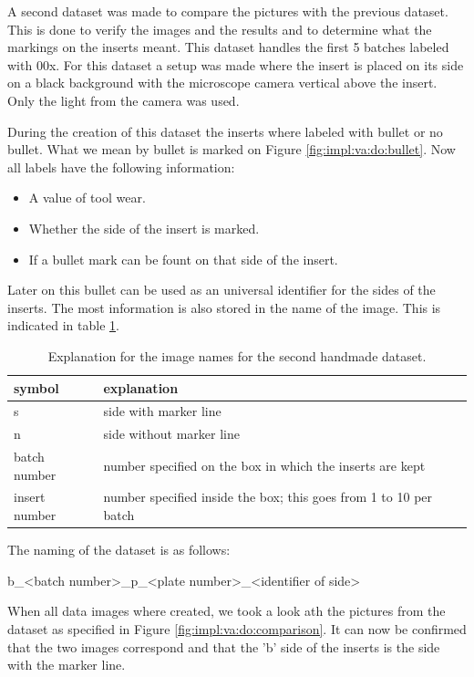 			A second dataset was made to compare the pictures with the previous dataset. This is done to verify the images and the results and to determine what the markings on the inserts meant. This dataset handles the first 5 batches labeled with 00x. For this dataset a setup was made where the insert is placed on its side on a black background with the microscope camera vertical above the insert. Only the light from the camera was used.

		During the creation of this dataset the inserts where labeled with bullet or no bullet. What we mean by bullet is marked on Figure \ref{fig:impl:va:do:bullet}. Now all labels have the following information:
		\begin{itemize}
			\item A value of tool wear.
			\item Whether the side of the insert is marked.
			\item If a bullet mark can be fount on that side of the insert.
\end{itemize}	

	Later on this bullet can be used as an universal identifier for the sides of the inserts. The most information is also stored in the name of the image. This is indicated in table \ref{tab:impl:dataset:shm:name}.
	
	\begin{table}
	\centering
	\caption{Explanation for the image names for the second handmade dataset. }
		\begin{tabular}{ |l|l| }
			\hline
 				symbol & explanation \tabularnewline
			\hline
			\hline
				 s & side with marker line \tabularnewline
			\hline
				 n & side without marker line \tabularnewline
			\hline
				 batch number & number specified on the box in which the inserts are kept \tabularnewline
			\hline
				 insert number & number specified inside the box; this goes from 1 to 10 per batch \tabularnewline
			\hline
		\end{tabular}
		\label{tab:impl:dataset:shm:name}
	\end{table}

		The naming of the dataset is as follows:

		b\_\textless{}batch number\textgreater{}\_p\_\textless{}plate number\textgreater{}\_\textless{}identifier of side\textgreater{}

		When all data images where created, we took a look ath the pictures from the dataset as specified in Figure \ref{fig:impl:va:do:comparison}.  It can now be confirmed that the two images correspond and that the 'b' side of the inserts is the side with the marker line. 

